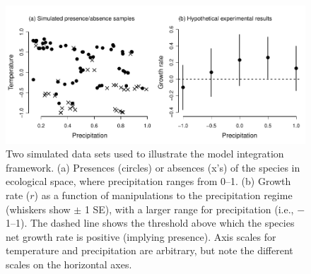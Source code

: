 
\begin{figure}[tb]
	\includegraphics{ex1_sampling.pdf}
	\caption{Two simulated data sets used to illustrate the model integration framework.
	(a) Presences (circles) or absences (x's) of the species in ecological space, where precipitation ranges from 0--1.
	(b) Growth rate ($r$) as a function of manipulations to the precipitation regime (whiskers show $\pm$ 1 SE), with a larger range for precipitation (i.e., \(-\)1--1).
	The dashed line shows the threshold above which the species net growth rate is positive (implying presence).
	Axis scales for temperature and precipitation are arbitrary, but note the different scales on the horizontal axes.}
	\label{fig:ex1_sampling}
\end{figure}


